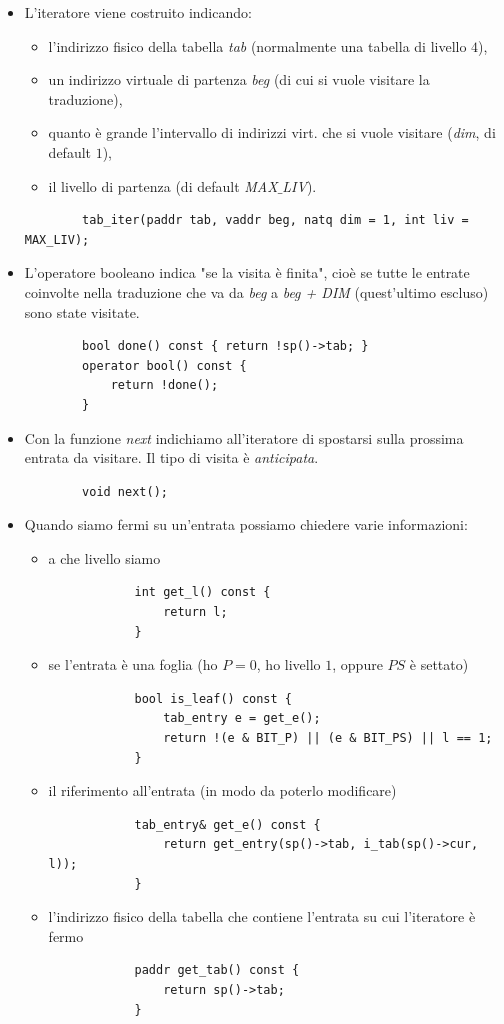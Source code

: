 \begin{itemize}
	\item L'iteratore viene costruito indicando:
	\begin{itemize}
		\item l'indirizzo fisico della tabella \emph{tab} (normalmente una tabella di livello $4$), 
		\item un indirizzo virtuale di partenza \emph{beg}  (di cui si vuole visitare la traduzione),
		\item quanto è grande l'intervallo di indirizzi virt. che si vuole visitare (\emph{dim}, di default $1$),
		\item il livello di partenza (di default \emph{MAX$\_$LIV}).
	\end{itemize} 
	\begin{verbatim}
		tab_iter(paddr tab, vaddr beg, natq dim = 1, int liv = MAX_LIV);
	\end{verbatim}
	\item L'operatore booleano indica "se la visita è finita", cioè se tutte le entrate coinvolte nella traduzione che va da \emph{beg} a \emph{beg + DIM} (quest'ultimo escluso) sono state visitate.
	\begin{verbatim}
		bool done() const { return !sp()->tab; }
		operator bool() const {
			return !done();
		}
	\end{verbatim}
	\item Con la funzione \emph{next} indichiamo all'iteratore di spostarsi sulla prossima entrata da visitare. Il tipo di visita è  \emph{anticipata}.
	\begin{verbatim}
		void next();
	\end{verbatim}
	\item Quando siamo fermi su un'entrata possiamo chiedere varie informazioni:
	\begin{itemize}
		\item a che livello siamo
		\begin{verbatim}
			int get_l() const {
				return l;
			}
		\end{verbatim}
		\item se l'entrata è una foglia (ho $P=0$, ho livello $1$, oppure $PS$ è settato)
		\begin{verbatim}
			bool is_leaf() const {
				tab_entry e = get_e();
				return !(e & BIT_P) || (e & BIT_PS) || l == 1;
			}
		\end{verbatim}
		\item il riferimento all'entrata (in modo da poterlo modificare)
		\begin{verbatim}
			tab_entry& get_e() const {
				return get_entry(sp()->tab, i_tab(sp()->cur, l));
			}
		\end{verbatim}
		\item l'indirizzo fisico della tabella che contiene l'entrata su cui l'iteratore è fermo 
		\begin{verbatim}
			paddr get_tab() const {
				return sp()->tab;
			}
		\end{verbatim}
	\end{itemize}
\end{itemize}
